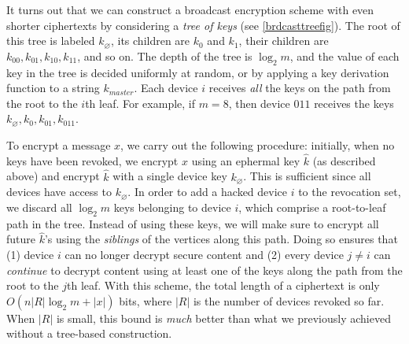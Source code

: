 It turns out that we can construct a broadcast encryption scheme with
even shorter ciphertexts by considering a \emph{tree of keys} (see
\cref{brdcasttreefig}). The root of this tree is labeled
\(k_{\varnothing}\), its children are \(k_0\) and \(k_1\), their
children are \(k_{00}, k_{01}, k_{10}, k_{11}\), and so on. The depth of
the tree is \(\log_2 m\), and the value of each key in the tree is
decided uniformly at random, or by applying a key derivation function to
a string \(k_{master}\). Each device \(i\) receives \emph{all} the keys
on the path from the root to the \(i\)th leaf. For example, if \(m=8\),
then device \(011\) receives the keys
\(k_{\varnothing}, k_0, k_{01}, k_{011}\).

To encrypt a message \(x\), we carry out the following procedure:
initially, when no keys have been revoked, we encrypt \(x\) using an
ephermal key \(\hat k\) (as described above) and encrypt \(\hat k\) with
a single device key \(k_\varnothing\). This is sufficient since all
devices have access to \(k_\varnothing\). In order to add a hacked
device \(i\) to the revocation set, we discard all \(\log_2 m\) keys
belonging to device \(i\), which comprise a root-to-leaf path in the
tree. Instead of using these keys, we will make sure to encrypt all
future \(\hat k\)'s using the \emph{siblings} of the vertices along this
path. Doing so ensures that (1) device \(i\) can no longer decrypt
secure content and (2) every device \(j \neq i\) can \emph{continue} to
decrypt content using at least one of the keys along the path from the
root to the \(j\)th leaf. With this scheme, the total length of a
ciphertext is only \(O(n|R| \log_2 m + |x|)\) bits, where \(|R|\) is the
number of devices revoked so far. When \(|R|\) is small, this bound is
\emph{much} better than what we previously achieved without a tree-based
construction.
